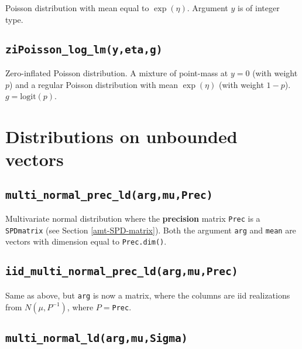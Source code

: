 \documentclass[
]{book}
\begin{document}
Poisson distribution with mean equal to \(\exp(\eta)\). Argument \(y\) is of integer type.

\hypertarget{zipoisson_log_lmyetag}{%
\subsection{\texorpdfstring{\texttt{ziPoisson\_log\_lm(y,eta,g)}}{ziPoisson\_log\_lm(y,eta,g)}}\label{zipoisson_log_lmyetag}}

Zero-inflated Poisson distribution. A mixture of point-mass at \(y=0\) (with weight \(p\)) and a regular Poisson distribution with mean \(\exp(\eta)\) (with weight \(1-p\)). \(g=\text{logit}(p)\).

\hypertarget{distributions-on-unbounded-vectors}{%
\section{Distributions on unbounded vectors}\label{distributions-on-unbounded-vectors}}

\hypertarget{multi_normal_prec_ldargmuprec}{%
\subsection{\texorpdfstring{\texttt{multi\_normal\_prec\_ld(arg,mu,Prec)}}{multi\_normal\_prec\_ld(arg,mu,Prec)}}\label{multi_normal_prec_ldargmuprec}}

Multivariate normal distribution where the \textbf{precision} matrix \texttt{Prec} is a \texttt{SPDmatrix} (see Section \ref{amt-SPD-matrix}). Both the argument \texttt{arg} and \texttt{mean} are vectors with dimension equal to \texttt{Prec.dim()}.

\hypertarget{iid_multi_normal_prec_ldargmuprec}{%
\subsection{\texorpdfstring{\texttt{iid\_multi\_normal\_prec\_ld(arg,mu,Prec)}}{iid\_multi\_normal\_prec\_ld(arg,mu,Prec)}}\label{iid_multi_normal_prec_ldargmuprec}}

Same as above, but \texttt{arg} is now a matrix, where the columns are iid realizations from \(N(\mu,P^{-1})\), where \(P=\)\texttt{Prec}.

\hypertarget{multi_normal_ldargmusigma}{%
\subsection{\texorpdfstring{\texttt{multi\_normal\_ld(arg,mu,Sigma)}}{multi\_normal\_ld(arg,mu,Sigma)}}\label{multi_normal_ldargmusigma}}
\end{document}
